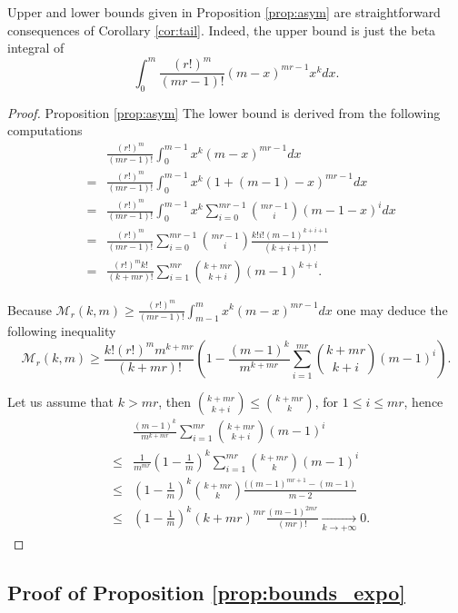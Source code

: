 \documentclass{article}
\theoremstyle{plain}
\newcommand{\V}{{\mathcal M}}
\begin{document}
Upper and lower bounds given in Proposition \ref{prop:asym} are straightforward consequences of  Corollary \ref{cor:tail}. Indeed, the upper bound is just the beta integral of $$\int_{0}^{m}\frac{(r!)^m}{(mr-1)!}(m-x)^{mr-1}x^kdx.$$ 
\begin{proof}{Proposition {\ref{prop:asym}}} The lower bound is derived from the following computations 
\begin{eqnarray*}
&&\frac{(r!)^m}{(mr-1)!}\int_{0}^{m-1}x^{k}(m-x)^{mr-1}dx \\
&=& \frac{(r!)^m}{(mr-1)!}\int_{0}^{m-1}x^{k}(1+(m-1)-x)^{mr-1}dx \\ &=&\frac{(r!)^m}{(mr-1)!}\int_{0}^{m-1}x^{k}\sum_{i=0}^{mr-1}\binom{mr-1}{i} (m-1-x)^{i}dx \\
&=& \frac{(r!)^m}{(mr-1)!}\sum_{i=0}^{mr-1} \binom{mr-1}{i} \frac{k!i!(m-1)^{k+i+1}}{(k+i+1)!}  \\
&=&  \frac{(r!)^mk!}{(k+mr)!} \sum_{i=1}^{mr} \binom{k+mr}{k+i}(m-1)^{k+i}.
\end{eqnarray*}

Because $ \V_{r}(k,m) \ge \frac{(r!)^m}{(mr-1)!}\int_{m-1}^{m}x^{k}(m-x)^{mr-1}dx$ one may deduce the following inequality
\[\V_{r}(k,m) 
 \ge   \frac{k!(r!)^m m^{k+mr} }{(k+mr)!}\left(1 - \frac{(m-1)^k}{m^{k+mr}}\sum_{i=1}^{mr} \binom{k+mr}{k+i}(m-1)^{i} \right).
\]

Let us assume that $k>mr$, then $\binom{k+mr}{k+i}\le \binom{k+mr}{k}$, for $1\le i\le mr$, hence
\begin{eqnarray*}
&&\frac{(m-1)^k}{m^{k+mr}}\sum_{i=1}^{mr} \binom{k+mr}{k+i}(m-1)^{i} \\
&\le& \frac{1}{m^{mr}}\left(1-\frac{1}{m}\right)^k \sum_{i=1}^{mr}\binom{k+mr}{k}  (m-1)^{i} \\
&\le& \left(1-\frac{1}{m}\right)^k \binom{k+mr}{k} \frac{((m-1)^{m r+1}-(m-1)}{m-2}  \\ 
&\le& \left(1-\frac{1}{m}\right)^k (k+mr)^{mr} \frac{(m-1)^{2mr}}{(mr)!} \underset{k \to +\infty}{\longrightarrow} 0.
\end{eqnarray*}
\end{proof}


\subsection{Proof of Proposition \ref{prop:bounds_expo}}
\end{document}
